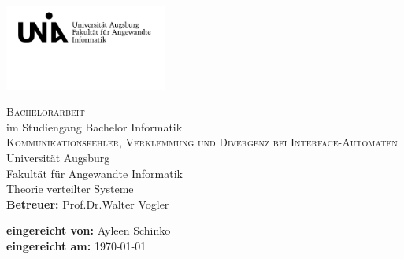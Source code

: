 \begin{titlepage}
\includegraphics[width=0.4\textwidth]{Uni_Aug_Logo_FAI_schwarz.png}
\vspace{-1cm}
\begin{center}
  \LARGE \textsc{Bachelorarbeit}\\
  \normalsize im Studiengang Bachelor Informatik\\
  \vfill
  \Huge \textsc{Kommunikationsfehler, Verklemmung und Divergenz bei
  Interface-Automaten}\\
  \vfill
  \Large Universität Augsburg\\
  Fakultät für Angewandte Informatik\\
  Theorie verteilter Systeme\\
  \vspace{2cm}
  \rmfamily \large \textbf{Betreuer:} Prof.\;Dr.\;Walter Vogler
\end{center}
\vspace{1.5cm}
\large \textbf{eingereicht von:}
Ayleen Schinko\\
\textbf{eingereicht am:}
\today
\end{titlepage}
